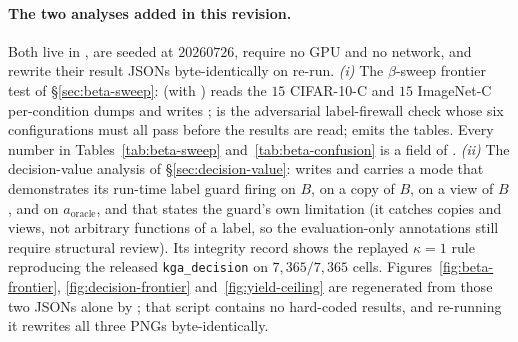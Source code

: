 \paragraph{The two analyses added in this revision.} Both live in
, are seeded at $20260726$, require no GPU and no
network, and rewrite their result JSONs byte-identically on re-run.
\emph{(i)} The $\beta$-sweep frontier test of \S\ref{sec:beta-sweep}:
 (with ) reads the $15$ CIFAR-10-C and $15$ ImageNet-C
per-condition dumps and writes ;
 is the adversarial label-firewall check whose six configurations must all
pass before the results are read;  emits the tables. Every number in
Tables~\ref{tab:beta-sweep} and~\ref{tab:beta-confusion} is a field of
.
\emph{(ii)} The decision-value analysis of \S\ref{sec:decision-value}:
 writes  and carries a 
mode that demonstrates its run-time label guard firing on $B$, on a copy of $B$, on a view of $B$,
and on $a_{\text{oracle}}$, and that states the guard's own limitation (it catches copies and views,
not arbitrary functions of a label, so the evaluation-only annotations still require structural
review). Its integrity record shows the replayed $\kappa{=}1$ rule reproducing the released
\texttt{kga\_decision} on $7{,}365/7{,}365$ cells.
Figures~\ref{fig:beta-frontier}, \ref{fig:decision-frontier} and~\ref{fig:yield-ceiling} are
regenerated from those two JSONs alone by
; that script contains no
hard-coded results, and re-running it rewrites all three PNGs byte-identically.

